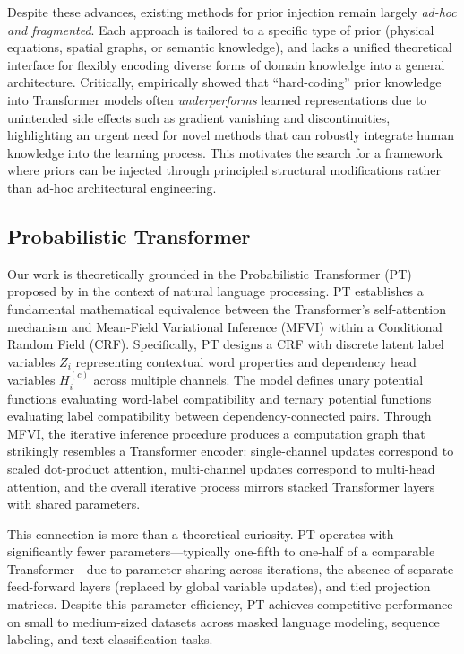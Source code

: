 Despite these advances, existing methods for prior injection remain largely \emph{ad-hoc and fragmented}. Each approach is tailored to a specific type of prior (physical equations, spatial graphs, or semantic knowledge), and lacks a unified theoretical interface for flexibly encoding diverse forms of domain knowledge into a general architecture. Critically, \citet{koliou2024comparing} empirically showed that ``hard-coding'' prior knowledge into Transformer models often \emph{underperforms} learned representations due to unintended side effects such as gradient vanishing and discontinuities, highlighting an urgent need for novel methods that can robustly integrate human knowledge into the learning process. This motivates the search for a framework where priors can be injected through principled structural modifications rather than ad-hoc architectural engineering.

\subsection{Probabilistic Transformer}

Our work is theoretically grounded in the Probabilistic Transformer (PT) proposed by \citet{wu2023probabilistic} in the context of natural language processing. PT establishes a fundamental mathematical equivalence between the Transformer's self-attention mechanism and Mean-Field Variational Inference (MFVI) within a Conditional Random Field (CRF). Specifically, PT designs a CRF with discrete latent label variables $Z_i$ representing contextual word properties and dependency head variables $H_i^{(c)}$ across multiple channels. The model defines unary potential functions evaluating word-label compatibility and ternary potential functions evaluating label compatibility between dependency-connected pairs. Through MFVI, the iterative inference procedure produces a computation graph that strikingly resembles a Transformer encoder: single-channel updates correspond to scaled dot-product attention, multi-channel updates correspond to multi-head attention, and the overall iterative process mirrors stacked Transformer layers with shared parameters.

This connection is more than a theoretical curiosity. PT operates with significantly fewer parameters---typically one-fifth to one-half of a comparable Transformer---due to parameter sharing across iterations, the absence of separate feed-forward layers (replaced by global variable updates), and tied projection matrices. Despite this parameter efficiency, PT achieves competitive performance on small to medium-sized datasets across masked language modeling, sequence labeling, and text classification tasks.

